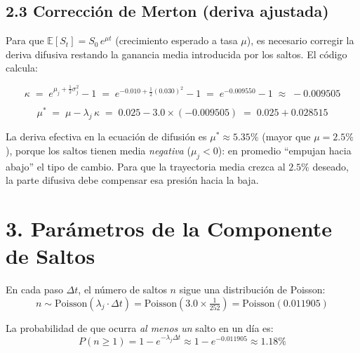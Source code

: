 \documentclass[11pt,letterpaper]{article}
\begin{document}
\subsection*{2.3 Corrección de Merton (deriva ajustada)}

Para que $\mathbb{E}[S_t] = S_0\,e^{\mu t}$ (crecimiento esperado a tasa
$\mu$), es necesario corregir la deriva difusiva restando la ganancia media
introducida por los saltos.  El código calcula:

\begin{equation}
    \kappa \;=\; e^{\mu_j + \frac{1}{2}\sigma_j^2} - 1
    \;=\; e^{-0.010 + \frac{1}{2}(0.030)^2} - 1
    \;=\; e^{-0.009550} - 1
    \;\approx\; -0.009505
    \label{eq:kappa}
\end{equation}

\begin{equation}
    \mu^* \;=\; \mu - \lambda_j\,\kappa
    \;=\; 0.025 - 3.0 \times (-0.009505)
    \;=\; 0.025 + 0.028515
    \label{eq:mu_corr}
\end{equation}

\begin{infobox}[title=Interpretación de la corrección]
La deriva efectiva en la ecuación de difusión es $\mu^* \approx 5.35\%$
(mayor que $\mu = 2.5\%$), porque los saltos tienen media \emph{negativa}
($\mu_j < 0$): en promedio ``empujan hacia abajo'' el tipo de cambio.
Para que la trayectoria media crezca al $2.5\%$ deseado, la parte difusiva
debe compensar esa presión hacia la baja.
\end{infobox}

\section*{3. Parámetros de la Componente de Saltos}

En cada paso $\Delta t$, el número de saltos $n$ sigue una distribución de
Poisson:
\begin{equation}
    n \sim \text{Poisson}(\lambda_j \cdot \Delta t)
    = \text{Poisson}\!\left(3.0 \times \tfrac{1}{252}\right)
    = \text{Poisson}(0.011905)
\end{equation}

La probabilidad de que ocurra \emph{al menos un} salto en un día es:
\[
P(n \geq 1) = 1 - e^{-\lambda_j\Delta t} \approx 1 - e^{-0.011905} \approx 1.18\%
\]
\end{document}
